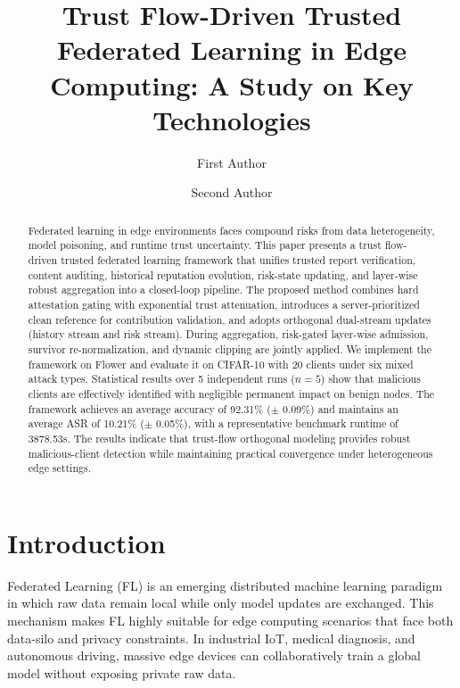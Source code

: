 \documentclass[runningheads]{llncs}
\begin{document}
\title{Trust Flow-Driven Trusted Federated Learning in Edge Computing: A Study on Key Technologies}

\author{First Author \and Second Author}


\maketitle

\begin{abstract}
Federated learning in edge environments faces compound risks from data heterogeneity, model poisoning, and runtime trust uncertainty. This paper presents a trust flow-driven trusted federated learning framework that unifies trusted report verification, content auditing, historical reputation evolution, risk-state updating, and layer-wise robust aggregation into a closed-loop pipeline. The proposed method combines hard attestation gating with exponential trust attenuation, introduces a server-prioritized clean reference for contribution validation, and adopts orthogonal dual-stream updates (history stream and risk stream). During aggregation, risk-gated layer-wise admission, survivor re-normalization, and dynamic clipping are jointly applied. We implement the framework on Flower and evaluate it on CIFAR-10 with 20 clients under six mixed attack types. Statistical results over 5 independent runs ($n=5$) show that malicious clients are effectively identified with negligible permanent impact on benign nodes. The framework achieves an average accuracy of 92.31\% ($\pm$ 0.09\%) and maintains an average ASR of 10.21\% ($\pm$ 0.05\%), with a representative benchmark runtime of 3878.53s. The results indicate that trust-flow orthogonal modeling provides robust malicious-client detection while maintaining practical convergence under heterogeneous edge settings.

\end{abstract}

\section{Introduction}
Federated Learning (FL) is an emerging distributed machine learning paradigm in which raw data remain local while only model updates are exchanged. This mechanism makes FL highly suitable for edge computing scenarios that face both data-silo and privacy constraints\cite{kairouz2021flsurvey}. In industrial IoT, medical diagnosis, and autonomous driving, massive edge devices can collaboratively train a global model without exposing private raw data.
\end{document}
